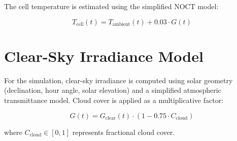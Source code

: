 The cell temperature is estimated using the simplified NOCT model:

\begin{equation}
    T_{\text{cell}}(t) = T_{\text{ambient}}(t) + 0.03 \cdot G(t)
    \label{eq:tcell}
\end{equation}

\section{Clear-Sky Irradiance Model}

For the simulation, clear-sky irradiance is computed using solar geometry (declination, hour angle, solar elevation) and a simplified atmospheric transmittance model. Cloud cover is applied as a multiplicative factor:

\begin{equation}
    G(t) = G_{\text{clear}}(t) \cdot (1 - 0.75 \cdot C_{\text{cloud}})
\end{equation}

where $C_{\text{cloud}} \in [0, 1]$ represents fractional cloud cover.
